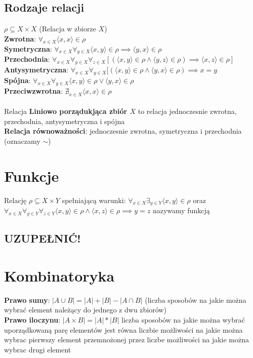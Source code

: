 \documentclass[a4paper,12pt]{article}
\begin{document}
\subsection{Rodzaje relacji}
$\rho \subseteq X \times X$ (Relacja w zbiorze $X$)\\
\textbf{Zwrotna}: $\forall_{x \in X} \langle x, x \rangle \in \rho $ \\
\textbf{Symetryczna}: $\forall_{x \in X} \forall_{y\in X}\langle x,y \rangle \in \rho \implies \langle y, x \rangle \in \rho $ \\
\textbf{Przechodnia}: $\forall_{x \in X} \forall_{y\in X} \forall_{z\in X} [(\langle x, y \rangle \in \rho \wedge \langle y, z \rangle \in \rho ) \implies \langle x, z \rangle \in \rho ]$ \\
\textbf{Antysymetryczna}: $\forall_{x \in X} \forall_{y\in X} [(\langle x, y \rangle \in \rho \wedge \langle y, x \rangle \in \rho ) \implies x=y$ \\
\textbf{Spójna}: $\forall_{x \in X}\forall_{y\in X} \langle x,y \rangle\in\rho \vee \langle y,x\rangle\in\rho$\\
\textbf{Przeciwzwrotna}: $\nexists_{x\in X} \langle x,x\rangle \in \rho$\\
\\
Relacja \textbf{Liniowo porządukjąca zbiór $X$} to relacja jednoczesnie zwrotna, przechodnia, antysymetryczna i spójna \\
\textbf{Relacja równoważności}: jednoczesnie zwrotna, symetryczna i przechodnia (oznaczamy $ \sim $)

\section{Funkcje}
Relację $\rho \subseteq X \times Y$ spełniającą warunki: $\forall_{x\in X} \exists_{y \in Y} \langle x, y \rangle \in \rho $ oraz $\forall_{x\in X} \forall_{y \in Y} \forall_{z \in Y} \langle x,y \rangle \in \rho \wedge\langle x, z \rangle \in \rho \implies y=z$ nazywamy funkcją

\subsection{UZUPEŁNIĆ!}

\section{Kombinatoryka}
\textbf{Prawo sumy}: $|A \cup B|=|A|+|B|-|A \cap B|$ (liczba sposobów na jakie można wybrać element należący do jednego z dwu zbiorów) \\
\textbf{Prawo iloczynu}: $|A\times B|=|A|*|B|$ liczba sposobów na jakie można wybrać uporządkowaną parę elementów jest równa liczbie możliwości na jakie można wybrac pierwszy element przemnożonej przez liczbe możliwości na jakie można wybrac drugi element 
\end{document}
